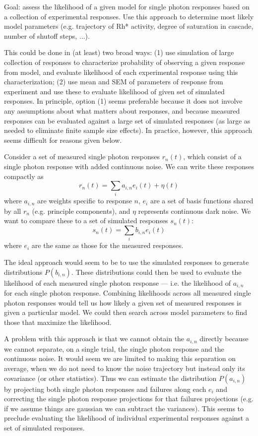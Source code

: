 \documentclass[12pt]{article}
\begin{document}
\baselineskip 18pt

Goal: assess the likelihood of a given model for single photon responses based on a collection of experimental responses.  Use this approach to determine most likely model parameters (e.g. trajectory of Rh* activity, degree of saturation in cascade, number of shutoff steps, ...). 

This could be done in (at least) two broad ways: (1) use simulation of large collection of responses to characterize probability of observing a given response from model, and evaluate likelihood of each experimental response using this characterization; (2) use mean and SEM of parameters of response from experiment and use these to evaluate likelihood of given set of simulated responses.  In principle, option (1) seems preferable because it does not involve any assumptions about what matters about responses, and because measured responses can be evaluated against a large set of simulated responses (as large as needed to eliminate finite sample size effects).  In practice, however, this approach seems difficult for reasons given below.

Consider a set of measured single photon responses $r_n(t)$, which consist of a single photon response with added continuous noise.  We can write these responses compactly as 
\begin{equation}
r_n(t) = \sum_i a_{i,n} e_i(t) + \eta(t)
\end{equation}
where $a_{i,n}$ are weights specific to response $n$, $e_i$ are a set of basis functions shared by all $r_n$ (e.g. principle components), and $\eta$ represents continuous dark noise.  We want to compare these to a set of simulated responses $s_n(t)$:
\begin{equation}
s_n(t) = \sum_i b_{i,n} e_i(t) 
\end{equation}
where $e_i$ are the same as those for the measured responses.  

The ideal approach would seem to be to use the simulated responses to generate distributions $P(b_{i,n})$.  These distributions could then be used to evaluate the likelihood of each measured single photon response --- i.e. the likelihood of $a_{i,n}$ for each single photon response.  Combining likelihoods across all measured single photon responses would tell us how likely a given set of measured responses is given a particular model.  We could then search across model parameters to find those that maximize the likelihood.  

A problem with this approach is that we cannot obtain the $a_{i,n}$ directly because we cannot separate, on a single trial, the single photon response and the continuous noise.  It would seem we are limited to making this separation on average, when we do not need to know the noise trajectory but instead only its covariance (or other statistics).  Thus we can estimate the distribution $P(a_{i,n})$ by projecting both single photon responses and failures along each $e_i$ and correcting the single photon response projections for that failures projections (e.g. if we assume things are gaussian we can subtract the variances).  This seems to preclude evaluating the likelihood of individual experimental responses against a set of simulated responses.
\end{document}
